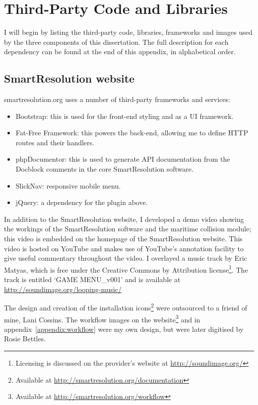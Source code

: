 \chapter{Third-Party Code and Libraries}

I will begin by listing the third-party code, libraries, frameworks and images used by the three components of this dissertation. The full description for each dependency can be found at the end of this appendix, in alphabetical order.

\section{SmartResolution website}

smartresolution.org uses a number of third-party frameworks and services:

\begin{itemize}
\item Bootstrap: this is used for the front-end styling and as a UI framework.
\item Fat-Free Framework: this powers the back-end, allowing me to define HTTP routes and their handlers.
\item phpDocumentor: this is used to generate API documentation from the Docblock comments in the core SmartResolution software.
\item SlickNav: responsive mobile menu.
\item jQuery: a dependency for the plugin above.
\end{itemize}

In addition to the SmartResolution website, I developed a demo video showing the workings of the SmartResolution software and the maritime collision module; this video is embedded on the homepage of the SmartResolution website. This video is hosted on YouTube and makes use of YouTube's annotation facility to give useful commentary throughout the video. I overlayed a music track by Eric Matyas, which is free under the Creative Commons by Attribution license\footnote{Licensing is discussed on the provider's website at \url{http://soundimage.org/}}. The track is entitled `GAME MENU\_v001' and is available at \url{http://soundimage.org/looping-music/}

The design and creation of the installation icons\footnote{Available at \url{http://smartresolution.org/documentation}} were outsourced to a friend of mine, Lani Cossins. The workflow images on the website\footnote{Available at \url{http://smartresolution.org/workflow}} and in appendix~\ref{appendix:workflow} were my own design, but were later digitised by Rosie Bettles. 

